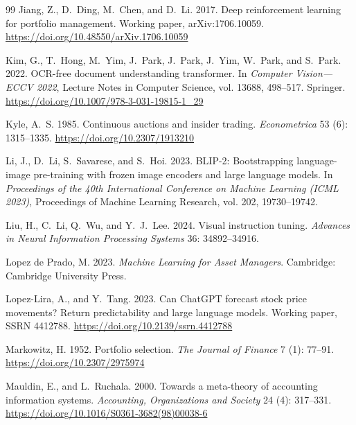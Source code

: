 \documentclass[12pt,letterpaper]{article}
\begin{document}
\begin{thebibliography}{99}
Jiang, Z., D.~Ding, M.~Chen, and D.~Li. 2017.
\newblock Deep reinforcement learning for portfolio management.
\newblock Working paper, arXiv:1706.10059.
\newblock \url{https://doi.org/10.48550/arXiv.1706.10059}

Kim, G., T.~Hong, M.~Yim, J.~Park, J.~Park, J.~Yim,
  W.~Park, and S.~Park. 2022.
\newblock OCR-free document understanding transformer.
\newblock In \textit{Computer Vision---ECCV 2022}, Lecture Notes
  in Computer Science, vol. 13688, 498--517. Springer.
\newblock \url{https://doi.org/10.1007/978-3-031-19815-1_29}

Kyle, A.~S. 1985.
\newblock Continuous auctions and insider trading.
\newblock \textit{Econometrica} 53 (6): 1315--1335.
\newblock \url{https://doi.org/10.2307/1913210}

Li, J., D.~Li, S.~Savarese, and S.~Hoi. 2023.
\newblock BLIP-2: Bootstrapping language-image pre-training with
  frozen image encoders and large language models.
\newblock In \textit{Proceedings of the 40th International Conference
  on Machine Learning (ICML 2023)}, Proceedings of Machine Learning
  Research, vol. 202, 19730--19742.

Liu, H., C.~Li, Q.~Wu, and Y.~J.~Lee. 2024.
\newblock Visual instruction tuning.
\newblock \textit{Advances in Neural Information Processing
  Systems} 36: 34892--34916.

Lopez de Prado, M. 2023.
\newblock \textit{Machine Learning for Asset Managers}.
\newblock Cambridge: Cambridge University Press.

Lopez-Lira, A., and Y.~Tang. 2023.
\newblock Can ChatGPT forecast stock price movements? Return
  predictability and large language models.
\newblock Working paper, SSRN 4412788.
\newblock \url{https://doi.org/10.2139/ssrn.4412788}

Markowitz, H. 1952.
\newblock Portfolio selection.
\newblock \textit{The Journal of Finance} 7 (1): 77--91.
\newblock \url{https://doi.org/10.2307/2975974}

Mauldin, E., and L.~Ruchala. 2000.
\newblock Towards a meta-theory of accounting information systems.
\newblock \textit{Accounting, Organizations and Society} 24 (4): 317--331.
\newblock \url{https://doi.org/10.1016/S0361-3682(98)00038-6}


\end{thebibliography}
\end{document}
